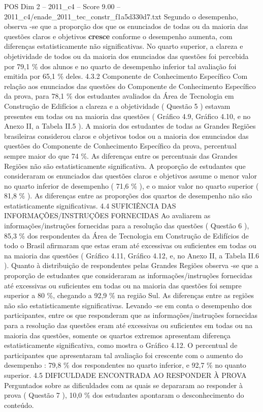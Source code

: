 \begin{textsample}{POS Dim 2 – 2011\_c4 – Score 9.00 – 2011\_c4/enade\_2011\_tec\_constr\_f1a5d330d7.txt}
Segundo o desempenho, observa -se que a proporção dos que os enunciados de todas ou da maioria das questões claros e objetivos \textbf{cresce} conforme o desempenho aumenta, com diferenças estatisticamente não significativas.
No quarto superior, a clareza e objetividade de todos ou da maioria dos enunciados das questões foi percebida por 79,1 \% dos alunos e no quarto de desempenho inferior tal avaliação foi emitida por 65,1 \% deles. 4.3.2 Componente de Conhecimento Específico Com relação aos enunciados das questões do Componente de Conhecimento Específico da prova, para 78,1 \% dos estudantes avaliados da Área de Tecnologia em Construção de Edifícios a clareza e a objetividade ( Questão 5 ) estavam presentes em todas ou na maioria das questões ( Gráfico 4.9, Gráfico 4.10, e no Anexo II, a Tabela II.5 ).
A maioria dos estudantes de todas as Grandes Regiões brasileiras considerou claros e objetivos todos ou a maioria dos enunciados das questões do Componente de Conhecimento Específico da prova, percentual sempre maior do que 74 \%.
As diferenças entre os percentuais das Grandes Regiões não são estatisticamente significativa.
A proporção de estudantes que consideraram os enunciados das questões claros e objetivos assume o menor valor no quarto inferior de desempenho ( 71,6 \% ), e o maior valor no quarto superior ( 81,8 \% ).
As diferenças entre as proporções dos quartos de desempenho não são estatisticamente significativas. 4.4 SUFICIÊNCIA DAS INFORMAÇÕES/INSTRUÇÕES FORNECIDAS Ao avaliarem as informações/instruções fornecidas para a resolução das questões ( Questão 6 ), 85,3 \% dos respondentes da Área de Tecnologia em Construção de Edifícios de todo o Brasil afirmaram que estas eram até excessivas ou suficientes em todas ou na maioria das questões ( Gráfico 4.11, Gráfico 4.12, e, no Anexo II, a Tabela II.6 ).
Quanto à distribuição de respondentes pelas Grandes Regiões observa -se que a proporção de estudantes que consideraram as informações/instruções fornecidas até excessivas ou suficientes em todas ou na maioria das questões foi sempre superior a 80 \%, chegando a 92,9 \% na região Sul.
As diferenças entre as regiões não são estatisticamente significativas.
Levando -se em conta o desempenho dos participantes, entre os que responderam que as informações/instruções fornecidas para a resolução das questões eram até excessivas ou suficientes em todas ou na maioria das questões, somente os quartos extremos apresentam diferença estatisticamente significativa, como mostra o Gráfico 4.12.
O percentual de participantes que apresentaram tal avaliação foi crescente com o aumento do desempenho : 79,8 \% dos respondentes no quarto inferior, e 92,7 \% no quanto superior. 4.5 DIFICULDADE ENCONTRADA AO RESPONDER À PROVA Perguntados sobre as dificuldades com as quais se depararam ao responder à prova ( Questão 7 ), 10,0 \% dos estudantes apontaram o desconhecimento do conteúdo.

\end{textsample}
